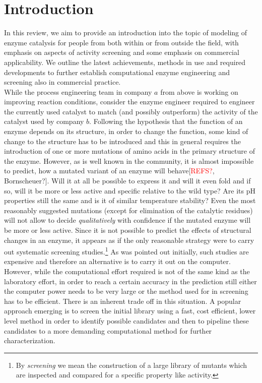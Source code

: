 \section{Introduction}\label{sec:intro}
In this review, we aim to provide an introduction into the topic of modeling of enzyme catalysis for people from both within or from outside the field, with emphasis on aspects of activity screening and some emphasis on commercial applicability.
We outline the latest achievements, methods in use and required developments to further establish computational enzyme engineering and screening also in commercial practice.\\
While the process engineering team in company $a$ from above is working on improving reaction conditions, consider the enzyme engineer required to engineer the currently used catalyst to match (and possibly outperform) the activity of the catalyst used by company $b$.
Following the hypothesis that the function of an enzyme depends on its structure, in order to change the function, some kind of change to the structure has to be introduced and this in general requires the introduction of one or more mutations of amino acids in the primary structure of the enzyme.
However, as is well known in the community, it is almost impossible to predict, how a mutated variant of an enzyme will behave[\textcolor{red}{REFS?}, Bornscheuer?].
Will it at all be possible to express it and will it even fold and if so, will it be more or less active and specific relative to the wild type?
Are its pH properties still the same and is it of similar temperature stability?
Even the most reasonably suggested mutations (except for elimination of the catalytic residues) will not allow to decide \textit{qualitatively} with confidence if the mutated enzyme will be more or less active.
Since it is not possible to predict the effects of structural changes in an enzyme, it appears as if the only reasonable strategy were to carry out systematic screening studies.\footnote{By \textit{screening} we mean the construction of a large library of mutants which are inspected and compared for a specific property like activity.}
As was pointed out initially, such studies are expensive and therefore an alternative is to carry it out on the computer.
However, while the computational effort required is not of the same kind as the laboratory effort, in order to reach a certain accuracy in the prediction still either the computer power needs to be very large or the method used for in screening has to be efficient.
There is an inherent trade off in this situation.
A popular approach emerging is to screen the initial library using a fast, cost efficient, lower level method in order to identify possible candidates and then to pipeline these candidates to a more demanding computational method for further characterization.

